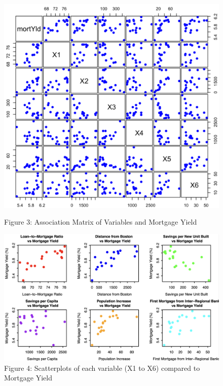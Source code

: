 \documentclass[
  12pt,
]{article}
\begin{document}
\begin{figure}[H]
\centering

\begin{minipage}[t]{0.38\textwidth}
\centering
\includegraphics[width=1\linewidth]{figures/Figure 3.png}
\captionsetup{font=normalsize}
\caption*{Figure 3: Association Matrix of Variables and Mortgage Yield}
\end{minipage}
\hfill
\begin{minipage}[t]{0.58\textwidth}
\centering
\vspace{-5.6cm}
\includegraphics[width=1\linewidth]{figures/Figure 4.png}
\captionsetup{font=normalsize}
\caption*{Figure 4: Scatterplots of each variable (X1 to X6) compared to Mortgage Yield}
\end{minipage}
\end{figure}
\end{document}
